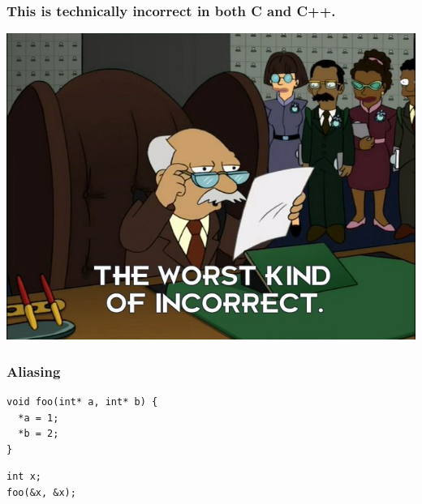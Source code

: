 \documentclass[aspectratio=169]{beamer}
\newif\iftransitions
\begin{document}
\begin{frame}
  \frametitle{This is technically incorrect in both C and C++.}

  \begin{center}
  \includegraphics[height=.9\textheight]{resources/technically_incorrect.jpg}
  \end{center}
\end{frame}


\begin{frame}[fragile]
  \frametitle{Aliasing}

  \iftransitions \pause \fi



  \begin{lstlisting}
void foo(int* a, int* b) {
  *a = 1;
  *b = 2;
}
  \end{lstlisting}
  \iftransitions \pause \fi
  \begin{lstlisting}
int x;
foo(&x, &x);
  \end{lstlisting}




\end{frame}
\end{document}
